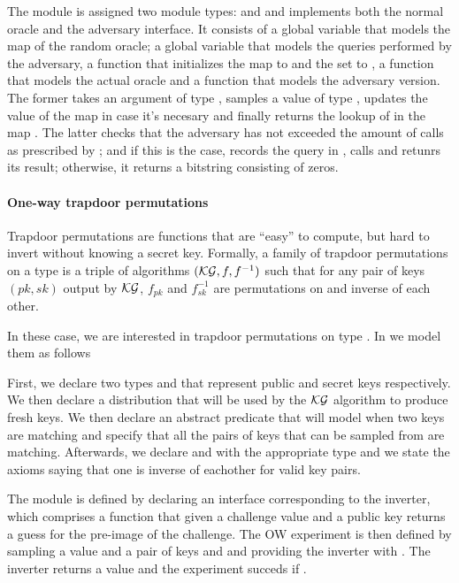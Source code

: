 

The module  is assigned two module types:  and
 and implements both the normal oracle and the adversary
interface. It consists of a global variable  that models the map
of the random oracle; a global variable  that models the queries
performed by the adversary, a function  that initializes the
map to  and the set to , a function  that
models the actual oracle and a function that models the adversary
version. The former takes an argument  of type ,
samples a value  of type , updates the value of
the map in case it's necesary and finally returns the lookup of 
in the map . The latter checks that the adversary has not
exceeded the amount of calls as prescribed by ; and if this is
the case, records the query in , calls  and retunrs its
result; otherwise, it returns a bitstring consisting of zeros.


\paragraph{One-way trapdoor permutations}
Trapdoor permutations are functions that are ``easy'' to compute, but
hard to invert without knowing a secret key. Formally, a family
of trapdoor permutations on a type  is a triple of algorithms
$(\mathcal{KG},f,f^{-1})$ such that for any pair of keys $(pk,sk)$ output by
$\mathcal{KG}$, $f_{pk}$ and $f^{-1}_{sk}$ are permutations on
 and inverse of each other. 

In these case, we are interested in trapdoor permutations on type
. In \EC we model them as follows


First, we declare two types  and  that represent
public and secret keys respectively. We then declare a distribution
 that will be used by the $\mathcal{KG}$ algorithm to produce fresh
keys. We then declare an abstract predicate that will model when two
keys are matching and specify that all the pairs of keys that can be
sampled from  are matching. Afterwards, we declare 
and  with the appropriate type and we state the axioms saying
that one is inverse of eachother for valid key pairs.
 
The module  is defined by declaring an interface corresponding
to the inverter, which comprises a function that given a challenge
value and a public key returns a guess for the pre-image of the
challenge. The OW experiment is then defined by sampling a value
 and a pair of keys  and  and providing the
inverter with . The inverter returns a value  and
the experiment succeds if .

